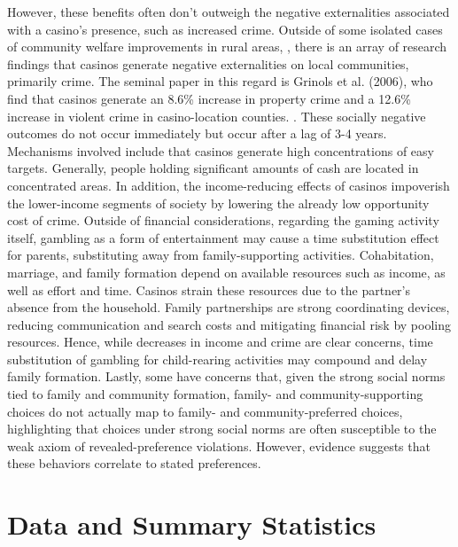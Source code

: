 \documentclass[12pt]{article}
\begin{document}
However, these benefits often don't outweigh the negative externalities associated with a casino's presence, such as increased crime. \parencite{Soriano2025Why, Scavette2022Casinos} Outside of some isolated cases of community welfare improvements in rural areas, \parencite{moellman2013indian}, there is an array of research findings that casinos generate negative externalities on local communities, primarily crime. The seminal paper in this regard is Grinols et al. (2006), who find that casinos generate an 8.6\% increase in property crime and a 12.6\% increase in violent crime in casino-location counties. \parencite{grinols2006casinos}. These socially negative outcomes do not occur immediately but occur after a lag of 3-4 years. Mechanisms involved include that casinos generate high concentrations of easy targets. Generally, people holding significant amounts of cash are located in concentrated areas.
In addition, the income-reducing effects of casinos impoverish the lower-income segments of society by lowering the already low opportunity cost of crime. \parencite{Clark2024LegalizedGambling}  Outside of financial considerations, regarding the gaming activity itself,  gambling as a form of entertainment may cause a time substitution effect for parents, substituting away from family-supporting activities. Cohabitation, marriage, and family formation depend on available resources such as income, as well as effort and time. Casinos strain these resources due to the partner's absence from the household. Family partnerships are strong coordinating devices, reducing communication and search costs and mitigating financial risk by pooling resources. \parencite{kearney2023two} Hence, while decreases in income and crime are clear concerns, time substitution of gambling for child-rearing activities may compound and delay family formation. Lastly, some have concerns that, given the strong social norms tied to family and community formation, family- and community-supporting choices do not actually map to family- and community-preferred choices, highlighting that choices under strong social norms are often susceptible to the weak axiom of revealed-preference violations. \parencite{sen1973behaviour} However, evidence suggests that these behaviors correlate to stated preferences. \parencite{muller2022illusion} 


\section{Data and Summary Statistics}
\end{document}
